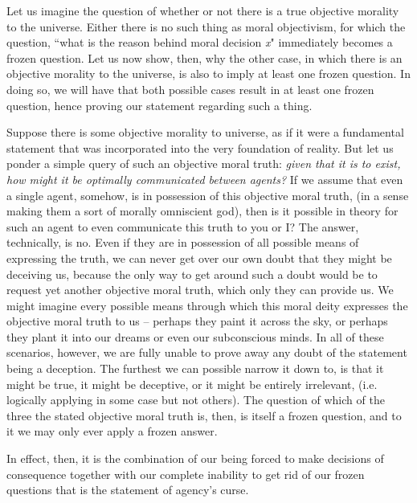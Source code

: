 Let us imagine the question of whether or not there is a true objective morality to the universe. Either there is no such thing as moral objectivism, for which the question, ``what is the reason behind moral decision \textit{x}" immediately becomes a frozen question. Let us now show, then, why the other case, in which there is an objective morality to the universe, is also to imply at least one frozen question. In doing so, we will have that both possible cases result in at least one frozen question, hence proving our statement regarding such a thing. 

Suppose there is some objective morality to universe, as if it were a fundamental statement that was incorporated into the very foundation of reality. But let us ponder a simple query of such an objective moral truth: \textit{given that it is to exist, how might it be optimally communicated between agents?} If we assume that even a single agent, somehow, is in possession of this objective moral truth, (in a sense making them a sort of morally omniscient god), then is it possible in theory for such an agent to even communicate this truth to you or I? The answer, technically, is no. Even if they are in possession of all possible means of expressing the truth, we can never get over our own doubt that they might be deceiving us, because the only way to get around such a doubt would be to request yet another objective moral truth, which only they can provide us. We might imagine every possible means through which this moral deity expresses the objective moral truth to us -- perhaps they paint it across the sky, or perhaps they plant it into our dreams or even our subconscious minds. In all of these scenarios, however, we are fully unable to prove away any doubt of the statement being a deception. The furthest we can possible narrow it down to, is that it might be true, it might be deceptive, or it might be entirely irrelevant, (i.e. logically applying in some case but not others). The question of which of the three the stated objective moral truth is, then, is itself a frozen question, and to it we may only ever apply a frozen answer.

In effect, then, it is the combination of our being forced to make decisions of consequence together with our complete inability to get rid of our frozen questions that is the statement of agency's curse. 

